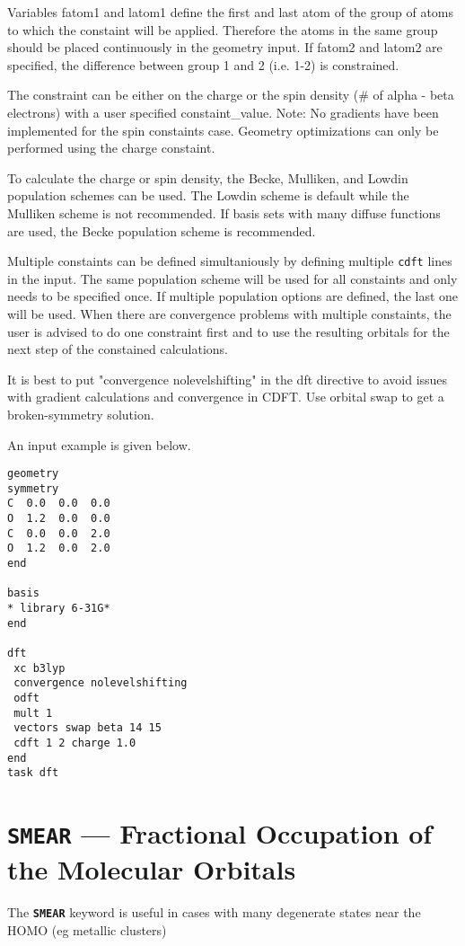 Variables fatom1 and latom1 define the first and last atom of the group of atoms to which
the constaint will be applied. Therefore the atoms in the same group should be placed 
continuously in the geometry input. If fatom2 and latom2 are specified, the difference between
group 1 and 2 (i.e. 1-2) is constrained. 

The constraint can be either on the charge or the spin density (\# of alpha - beta electrons) with
a user specified constaint\_value.  Note: No gradients have been implemented for the spin constaints 
case. Geometry optimizations can only be performed using the charge constaint.

To calculate the charge or spin density, the Becke, Mulliken, and Lowdin population schemes can be 
used. The Lowdin scheme is default while the Mulliken scheme is not recommended. If basis sets with 
many diffuse functions are used, the Becke population scheme is recommended.

Multiple constaints can be defined simultaniously by defining multiple {\tt cdft} lines in the input. 
The same population scheme will be used for all constaints and only needs to be specified once. If 
multiple population options are defined, the last one will be used. When there are convergence
problems with multiple constaints, the user is advised to do one constraint first and to use the
resulting orbitals for the next step of the constained calculations.

It is best to put "convergence nolevelshifting" in the dft directive to avoid issues with gradient 
calculations and convergence in CDFT. Use orbital swap to get a broken-symmetry solution.

An input example is given below.

\begin{verbatim}
geometry
symmetry
C  0.0  0.0  0.0
O  1.2  0.0  0.0
C  0.0  0.0  2.0
O  1.2  0.0  2.0
end

basis
* library 6-31G*
end

dft
 xc b3lyp
 convergence nolevelshifting
 odft
 mult 1
 vectors swap beta 14 15
 cdft 1 2 charge 1.0
end
task dft
\end{verbatim}

\section{{\tt SMEAR} --- Fractional Occupation of the Molecular Orbitals}
\label{smear}

The {\tt \bf SMEAR} keyword is useful in cases with many degenerate states
near the HOMO (eg metallic clusters)

